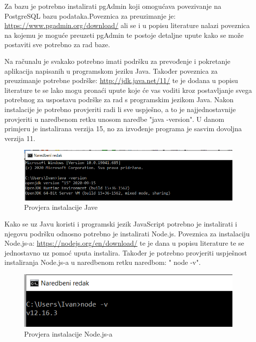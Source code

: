 			Za bazu je potrebno instalirati pgAdmin koji omogućava povezivanje na PostgreSQL bazu podataka.Poveznica za preuzimanje je: \url{https://www.pgadmin.org/download/} ali se i u  popisu literature nalazi poveznica na kojemu je moguće preuzeti pgAdmin te postoje detaljne upute kako se može postaviti sve potrebno za rad baze.
		
			Na računalu je svakako potrebno imati podršku za prevođenje i pokretanje aplikacija napisanih u programskom jeziku Java. Također poveznica za preuzimanje potrebne podrške: \url{http://jdk.java.net/11/} te je dodana u popisu literature te se lako mogu pronaći upute koje će vas voditi kroz postavljanje svega potrebnog za uspostavu podrške za rad s programskim jezikom Java. Nakon instalacije je potrebno provjeriti radi li sve uspješno, a to je najjednostavnije provjeriti u naredbenom retku unosom naredbe "java -version". U danom primjeru je instalirana verzija 15, no za izvođenje programa je sasvim dovoljna verzija 11. 
			
			\begin{figure}[H]
				\includegraphics[scale=0.6]{slike/Java.PNG} %
				\centering
				\caption{Provjera instalacije Jave}
				\label{fig:java}
			\end{figure}
			
			Kako se uz Javu koristi i programski jezik JavaScript potrebno je instalirati i njegovu podršku odnosno potrebno je instalirati Node.js. Poveznica za instalaciju Node.js-a: \url{https://nodejs.org/en/download/} te je dana u popisu literature te se jednostavno uz pomoć uputa instalira. Također je potrebno provjeriti uspješnost instaliranja Node.js-a u naredbenom retku naredbom: " node -v".
			
			\begin{figure}[H]
				\includegraphics[scale=0.6]{slike/node.PNG} %
				\centering
				\caption{Provjera instalacije Node.js-a}
				\label{fig:node}
			\end{figure}
		
